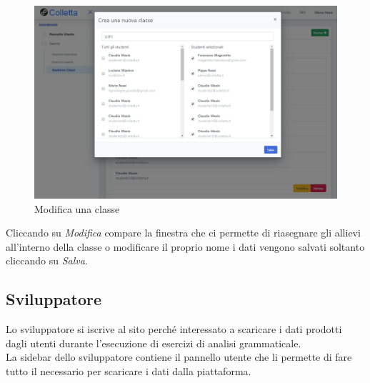          \begin{figure}[H]
            	\centering
        		\includegraphics[width=17cm]{sez/img/insegnante/modificaclasse.PNG} 
            	\caption{Modifica una classe}\label{fig:1}
        	\end{figure}
        	
        	
Cliccando su \textit{Modifica} compare la finestra che ci permette di riasegnare gli allievi all'interno della classe o modificare il proprio nome i dati vengono salvati soltanto cliccando su \textit{Salva}.
        
	\newpage
    \subsection{Sviluppatore}
    Lo sviluppatore si iscrive al sito perché interessato a scaricare i dati prodotti dagli utenti durante l'esecuzione di esercizi di analisi grammaticale.
    	 \\La sidebar dello sviluppatore contiene il pannello utente che li permette di fare tutto il necessario per scaricare i dati dalla piattaforma.
   
